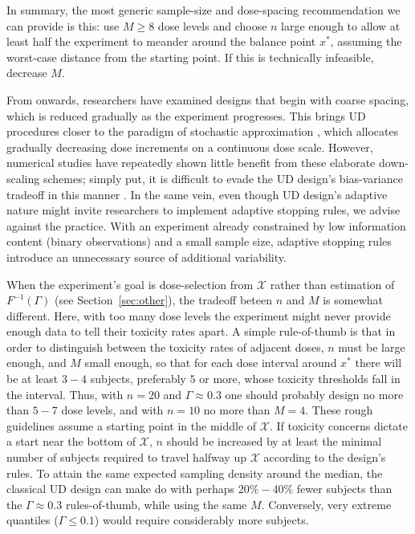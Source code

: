 In summary, the most generic sample-size and dose-spacing recommendation we can provide is this: use $M\geq 8$ dose levels and choose $n$ large enough to allow at least half the experiment to meander around the balance point $x^*$, assuming the worst-case distance from the starting point. If this is technically infeasible, decrease $M$.

From \cite{Weth:Sequ:1963} onwards, researchers have examined designs that begin with coarse spacing, which is reduced  gradually as the experiment progresses. This brings UD procedures closer to the paradigm of stochastic approximation \citep{Robb:Monro:Asto:1951}, which allocates gradually decreasing dose increments on a continuous dose scale. However, numerical studies have repeatedly shown little benefit from these elaborate down-scaling schemes; simply put, it is difficult to evade the UD design's bias-variance tradeoff in this manner \citep{Garc:Pere:Forc:1998}. In the same vein, even though UD design's adaptive nature might invite researchers to implement adaptive stopping rules, we  advise against the practice. With an experiment already constrained by low information content (binary observations) and a small sample size, adaptive stopping rules introduce an unnecessary source of additional variability.

When the experiment's goal is dose-selection from $\mathcal{X}$ rather than estimation of $F^{-1}(\Gamma)$ (see Section~\ref{sec:other}), the tradeoff beteen $n$ and $M$ is somewhat different. Here, with too many dose levels the experiment might never provide enough data to tell their toxicity rates apart. A simple rule-of-thumb is that in order to distinguish between the toxicity rates of adjacent doses, $n$ must be large enough, and $M$ small enough, so that for each dose interval around $x^*$ there will be at least $3-4$ subjects, preferably $5$ or more, whose toxicity thresholds fall in the interval.  Thus, with $n=20$ and $\Gamma\approx 0.3$ one should probably design no more than $5-7$ dose levels, and with $n=10$ no more than $M=4$. These rough guidelines assume a starting point in the middle of $\mathcal{X}$. If toxicity concerns dictate a start near the bottom of $\mathcal{X}$, $n$ should be increased by at least the minimal number of subjects required to travel halfway up $\mathcal{X}$ according to the design's rules. To attain the same expected sampling density around the median, the classical UD design can make do with perhaps $20\%-40\%$ fewer subjects than the $\Gamma\approx 0.3$ rules-of-thumb, while using the same $M$. Conversely, very extreme quantiles ($\Gamma\leq 0.1$) would require considerably more subjects.

